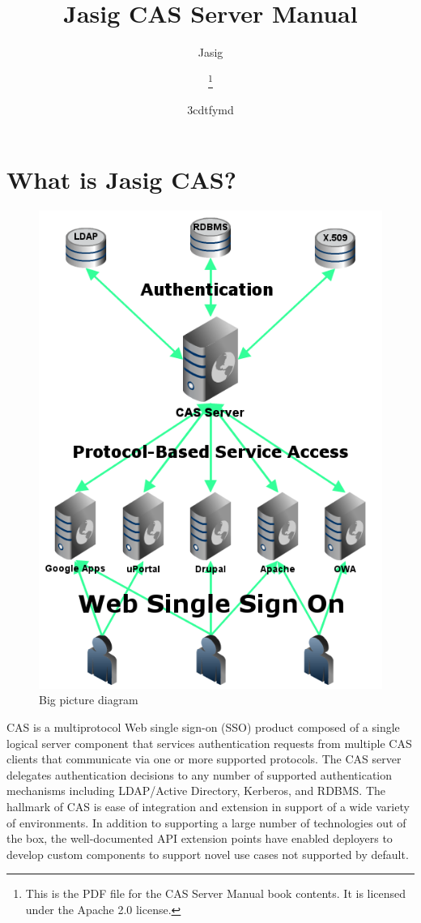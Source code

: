 \documentclass[a4paper]{book}
\title{Jasig CAS Server Manual}
\author{Jasig}
\title{\textbf{\savedtitle}}
\author{\textbf{\savedauthor}\thanks{This is the PDF file for the CAS Server Manual book contents. It is licensed under the Apache 2.0 license.}}
\date{\w3cdtfymd}
\makeatletter
\let\savedauthor=\@author
\let\savedtitle=\@title
\newcounter{tab}[chapter]
\newcommand{\chap}[1]{\newpage\thispagestyle{empty}\chapter{#1}\label{chap:\thechapter}}
\makeatother
\begin{document}
\frontmatter
\maketitle
\thispagestyle{empty}
\setcounter{tocdepth}{4}
\tableofcontents\newpage\thispagestyle{empty}

\mainmatter
\fancyhf{}
\fancyhead[LE]{{\small\leftmark}}
\fancyhead[RO]{{\small\rightmark}}
\fancyhead[RE,LO]{{\small\savedauthor\hspace*{1ex}\textbf{\savedtitle}}}
\fancyfoot[LE,RO]{\small\textbf\thepage}
\pagestyle{fancy}

\chap{What is Jasig CAS?}

\begin{figure}[htb]
\centering
\includegraphics{media/sso-diagram.png}
\caption{Big picture diagram}
\end{figure}

CAS is a multiprotocol Web single sign-on (SSO) product composed of a single logical server component that services authentication requests from multiple CAS clients that communicate via one or more supported protocols. The CAS server delegates authentication decisions to any number of supported authentication mechanisms including LDAP/Active Directory, Kerberos, and RDBMS. The hallmark of CAS is ease of integration and extension in support of a wide variety of environments. In addition to supporting a large number of technologies out of the box, the well-documented API extension points have enabled deployers to develop custom components to support novel use cases not supported by default.
\end{document}
